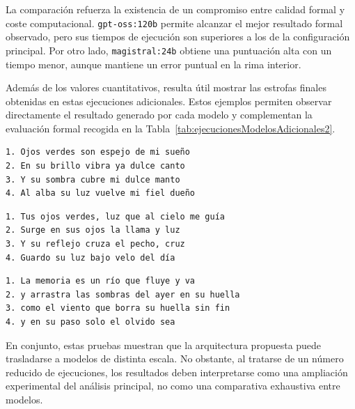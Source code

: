 \documentclass[12pt,a4paper,twoside,openright]{book}
\begin{document}
La comparación refuerza la existencia de un compromiso entre calidad formal y coste computacional. \texttt{gpt-oss:120b} permite alcanzar el mejor resultado formal observado, pero sus tiempos de ejecución son superiores a los de la configuración principal.
Por otro lado, \texttt{magistral:24b} obtiene una puntuación alta con un tiempo menor, aunque mantiene un error puntual en la rima interior.

Además de los valores cuantitativos, resulta útil mostrar las estrofas finales obtenidas en estas ejecuciones adicionales.
Estos ejemplos permiten observar directamente el resultado generado por cada modelo y complementan la evaluación formal recogida en la Tabla~\ref{tab:ejecucionesModelosAdicionales2}.

\begin{lstlisting}[caption={Estrofa obtenida con el modelo gpt-oss:120b en la primera ejecución adicional}, label={lst:gptoss120bEjecucion1}]
1. Ojos verdes son espejo de mi sueño
2. En su brillo vibra ya dulce canto
3. Y su sombra cubre mi dulce manto
4. Al alba su luz vuelve mi fiel dueño
\end{lstlisting}

\begin{lstlisting}[caption={Estrofa obtenida con el modelo gpt-oss:120b en la segunda ejecución adicional}, label={lst:gptoss120bEjecucion2}]
1. Tus ojos verdes, luz que al cielo me guía
2. Surge en sus ojos la llama y luz
3. Y su reflejo cruza el pecho, cruz
4. Guardo su luz bajo velo del día
\end{lstlisting}

\begin{lstlisting}[caption={Estrofa obtenida con el modelo magistral:latest en la ejecución adicional}, label={lst:magistralEjecucion}]
1. La memoria es un río que fluye y va
2. y arrastra las sombras del ayer en su huella
3. como el viento que borra su huella sin fin
4. y en su paso solo el olvido sea
\end{lstlisting}

En conjunto, estas pruebas muestran que la arquitectura propuesta puede trasladarse a modelos de distinta escala.
No obstante, al tratarse de un número reducido de ejecuciones, los resultados deben interpretarse como una ampliación experimental del análisis principal, no como una comparativa exhaustiva entre modelos.
\end{document}
